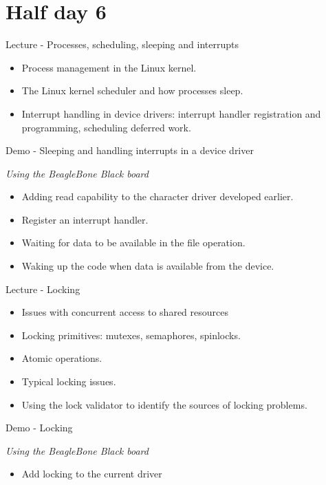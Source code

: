 \documentclass[a4paper,12pt,obeyspaces,spaces,hyphens]{article}
\begin{document}
\section{Half day 6}
\feagendatwocolumn
{Lecture - Processes, scheduling, sleeping and interrupts}
{
  \begin{itemize}
  \item Process management in the Linux kernel.
  \item The Linux kernel scheduler and how processes sleep.
  \item Interrupt handling in device drivers: interrupt handler
    registration and programming, scheduling deferred work.
  \end{itemize}
}
{Demo - Sleeping and handling interrupts in a device driver}
{
  {\em Using the BeagleBone Black board}
  \begin{itemize}
  \item Adding read capability to the character driver developed
    earlier.
  \item Register an interrupt handler.
  \item Waiting for data to be available in the  file operation.
  \item Waking up the code when data is available from the device.
  \end{itemize}
}

\feagendatwocolumn
{Lecture - Locking}
{
  \begin{itemize}
  \item Issues with concurrent access to shared resources
  \item Locking primitives: mutexes, semaphores, spinlocks.
  \item Atomic operations.
  \item Typical locking issues.
  \item Using the lock validator to identify the sources of locking
    problems.
  \end{itemize}
}
{Demo - Locking}
{
  {\em Using the BeagleBone Black board}
  \begin{itemize}
  \item Add locking to the current driver
  \end{itemize}
}
\end{document}
